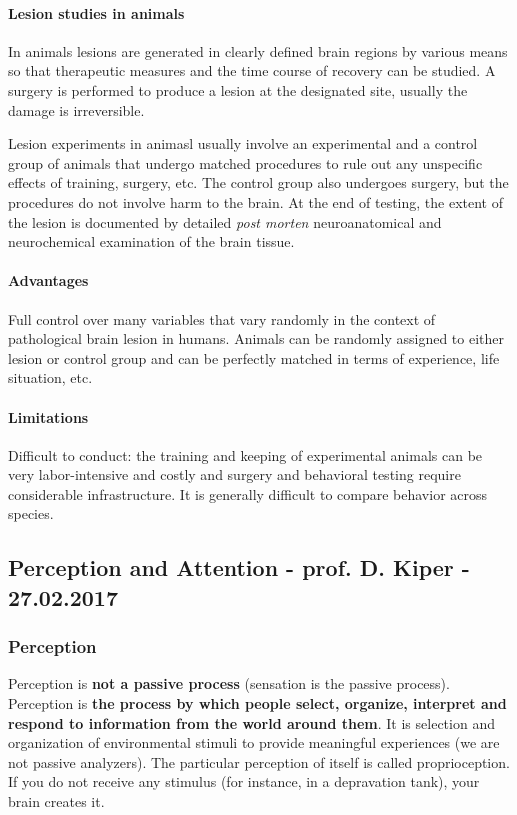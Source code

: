\documentclass[12pt,article,oneside,a4paper]{memoir}
\begin{document}
\paragraph{Lesion studies in animals} In animals lesions are generated in clearly defined brain regions by various means so that therapeutic measures and the time course of recovery can be studied. A surgery is performed to produce a lesion at the designated site, usually the damage is irreversible.

Lesion experiments in animasl usually involve an experimental and a control group of animals that undergo matched procedures to rule out any unspecific effects of training, surgery, etc. The control group also undergoes surgery, but the procedures do not involve harm to the brain. At the end of testing, the extent of the lesion is documented by detailed \textit{post morten} neuroanatomical and neurochemical examination of the brain tissue.

\paragraph{Advantages} Full control over many variables that vary randomly in the context of pathological brain lesion in humans. Animals can be randomly assigned to either lesion or control group and can be perfectly matched in terms of experience, life situation, etc.

\paragraph{Limitations} Difficult to conduct: the training and keeping of experimental animals can be very labor-intensive and costly and surgery and behavioral testing require considerable infrastructure. It is generally difficult to compare behavior across species.
\newpage
\subsection{Perception and Attention - prof. D. Kiper - 27.02.2017}

\subsubsection{Perception}
Perception is \textbf{not a passive process} (sensation is the passive process). Perception is \textbf{the process by which people select, organize, interpret and respond to information from the world around them}. It is selection and organization of environmental stimuli to provide meaningful experiences (we are not passive analyzers). The particular perception of itself is called proprioception. If you do not receive any stimulus (for instance, in a depravation tank), your brain creates it.
\end{document}
